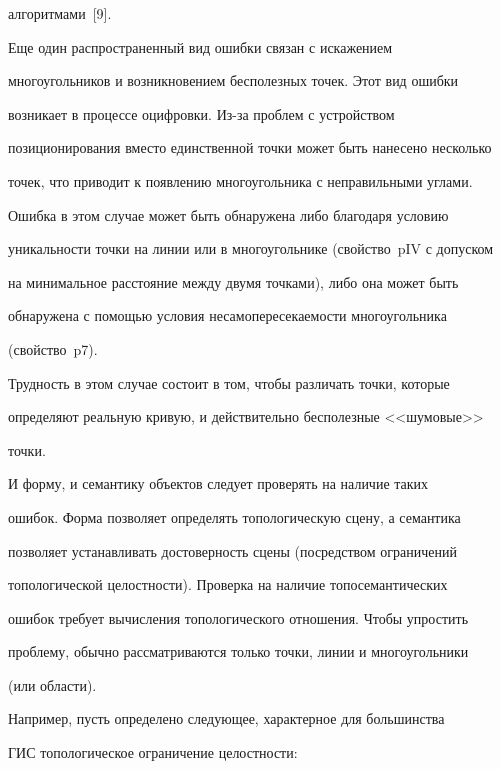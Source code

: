 алгоритмами~[9].


    


    Еще один распространенный вид ошибки связан с искажением 


многоугольников и возникновением бесполезных точек. Этот вид ошибки 


возникает в процессе оцифровки. Из-за проблем с устройством 


позиционирования вмес\-то единственной точки может быть нанесено несколько 


точек, что приводит к появлению многоугольника с неправильными углами. 


Ошибка в этом случае может быть обнаружена либо благодаря условию 


уникальности точки на линии или в многоугольнике (свойство~pIV с допуском 


на минимальное расстояние между двумя точками), либо она может быть 


обнаружена с помощью условия несамопересекаемости многоугольника 


(свойство~p7). 


    


    Трудность в этом случае состоит в том, чтобы различать точки, которые 


определяют реальную кривую, и действительно бесполезные <<шумовые>> 


точки.


    


    И форму, и семантику объектов следует проверять на наличие таких 


ошибок. Форма позволяет определять топологическую сцену, а семантика 


позволяет устанавливать достоверность сцены (посредством ограничений 


топологической целостности). Проверка на наличие топосемантических 


ошибок требует вы\-чис\-ле\-ния топологического отношения. Чтобы упростить 


проблему, обычно рас\-смат\-ри\-ва\-ют\-ся только точки, линии и многоугольники 


(или области). 


    


    Например, пусть определено следующее, характерное для большинства 


ГИС топологическое ограничение целостности: 


